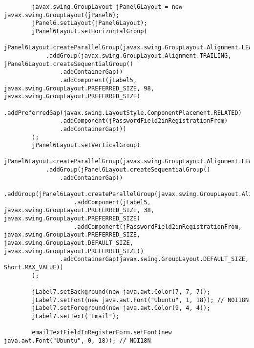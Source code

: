 \documentclass[12pt,a4paper]{article}
\begin{document}
\begin{lstlisting}
        javax.swing.GroupLayout jPanel6Layout = new javax.swing.GroupLayout(jPanel6);
        jPanel6.setLayout(jPanel6Layout);
        jPanel6Layout.setHorizontalGroup(
            jPanel6Layout.createParallelGroup(javax.swing.GroupLayout.Alignment.LEADING)
            .addGroup(javax.swing.GroupLayout.Alignment.TRAILING, jPanel6Layout.createSequentialGroup()
                .addContainerGap()
                .addComponent(jLabel5, javax.swing.GroupLayout.PREFERRED_SIZE, 98, javax.swing.GroupLayout.PREFERRED_SIZE)
                .addPreferredGap(javax.swing.LayoutStyle.ComponentPlacement.RELATED)
                .addComponent(jPasswordField2inRegistrationFrom)
                .addContainerGap())
        );
        jPanel6Layout.setVerticalGroup(
            jPanel6Layout.createParallelGroup(javax.swing.GroupLayout.Alignment.LEADING)
            .addGroup(jPanel6Layout.createSequentialGroup()
                .addContainerGap()
                .addGroup(jPanel6Layout.createParallelGroup(javax.swing.GroupLayout.Alignment.BASELINE)
                    .addComponent(jLabel5, javax.swing.GroupLayout.PREFERRED_SIZE, 38, javax.swing.GroupLayout.PREFERRED_SIZE)
                    .addComponent(jPasswordField2inRegistrationFrom, javax.swing.GroupLayout.PREFERRED_SIZE, javax.swing.GroupLayout.DEFAULT_SIZE, javax.swing.GroupLayout.PREFERRED_SIZE))
                .addContainerGap(javax.swing.GroupLayout.DEFAULT_SIZE, Short.MAX_VALUE))
        );

        jLabel7.setBackground(new java.awt.Color(7, 7, 7));
        jLabel7.setFont(new java.awt.Font("Ubuntu", 1, 18)); // NOI18N
        jLabel7.setForeground(new java.awt.Color(9, 4, 4));
        jLabel7.setText("Email");

        emailTextFieldInRegisterForm.setFont(new java.awt.Font("Ubuntu", 0, 18)); // NOI18N


\end{lstlisting}
\end{document}
